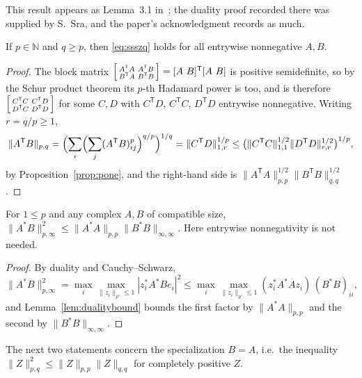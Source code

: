 This result appears as Lemma~3.1 in~\citet{SahSawhneyStonerZhao2020}; the duality proof recorded
there was supplied by S.~Sra, and the paper's acknowledgment records as much.

\begin{proposition}\label{prop:intp}
If $p\in\mathbb N$ and $q\ge p$, then \eqref{eq:ssszq} holds for all entrywise nonnegative $A,B$.
\end{proposition}
\begin{proof}
The block matrix $\begin{bsmallmatrix}A^{\mathsf T}A&A^{\mathsf T}B\\B^{\mathsf T}A&B^{\mathsf T}B\end{bsmallmatrix}=[A\ B]^{\mathsf T}[A\ B]$ is positive semidefinite, so by the Schur product theorem its $p$-th Hadamard power is too, and is therefore $\begin{bsmallmatrix}C^{\mathsf T}C&C^{\mathsf T}D\\D^{\mathsf T}C&D^{\mathsf T}D\end{bsmallmatrix}$ for some $C,D$ with $C^{\mathsf T}D$, $C^{\mathsf T}C$, $D^{\mathsf T}D$ entrywise nonnegative.  Writing $r=q/p\ge1$,
\[
\|A^{\mathsf T}B\|_{{p,q}}=\Bigl(\sum_i\Bigl(\sum_j (A^{\mathsf T}B)_{ij}^{p}\Bigr)^{q/p}\Bigr)^{1/q}
=\|C^{\mathsf T}D\|_{{1,r}}^{1/p}
\le\bigl(\|C^{\mathsf T}C\|_{{1,1}}^{1/2}\|D^{\mathsf T}D\|_{{r,r}}^{1/2}\bigr)^{1/p},
\]
by Proposition~\ref{prop:pone}, and the right-hand side is $\|A^{\mathsf T}A\|_{{p,p}}^{1/2}\|B^{\mathsf T}B\|_{{q,q}}^{1/2}$.
\end{proof}

\begin{proposition}[$q=\infty$]\label{prop:qinf}
For $1\le p$ and any complex $A,B$ of compatible size,
$\|A^*B\|_{{p,\infty}}^2\le\|A^*A\|_{{p,p}}\|B^*B\|_{{\infty,\infty}}$.
Here entrywise nonnegativity is not needed.
\end{proposition}
\begin{proof}
By duality and Cauchy--Schwarz,
\[
\|A^*B\|_{{p,\infty}}^2=\max_i\max_{\|z_i\|_{p'}\le1}|z_i^*A^*Be_i|^2
\le\max_i\max_{\|z_i\|_{p'}\le1}(z_i^*A^*Az_i)\,(B^*B)_{ii},
\]
and Lemma~\ref{lem:dualitybound} bounds the first factor by $\|A^*A\|_{{p,p}}$ and the second by $\|B^*B\|_{{\infty,\infty}}$.
\end{proof}

The next two statements concern the specialization $B=A$, i.e.\ the inequality
$\|Z\|_{{p,q}}^2\le\|Z\|_{{p,p}}\|Z\|_{{q,q}}$ for completely positive $Z$.

